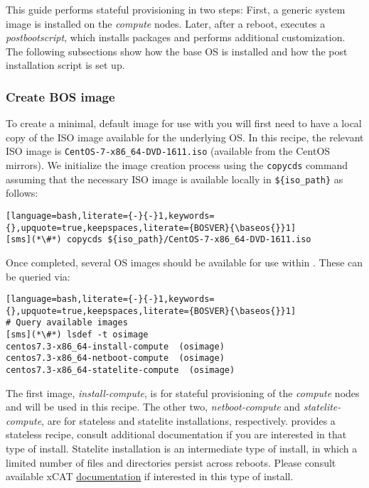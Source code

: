 
This guide performs stateful provisioning in two steps: First, a generic system
image is installed on the {\em compute} nodes. Later, after a reboot, \xCAT{}
executes a  {\em postbootscript}, which installs   \OHPC{} packages and performs
additional customization. The following subsections show how the base OS is
installed and how the post installation script is set up.

\subsubsection{Create BOS image} \label{sec:assemble_bos}

To create a minimal, default image for use with \xCAT{} you will first need to
have a local copy of the ISO image available for the underlying OS. In this
recipe, the relevant ISO image is \texttt{CentOS-7-x86\_64-DVD-1611.iso}
(available from the CentOS mirrors). We initialize the image creation process
using the \texttt{copycds} command assuming that the necessary ISO image is
available locally in \texttt{\$\{iso\_path\}} as follows:

\begin{lstlisting}[language=bash,literate={-}{-}1,keywords={},upquote=true,keepspaces,literate={BOSVER}{\baseos{}}1]
[sms](*\#*) copycds ${iso_path}/CentOS-7-x86_64-DVD-1611.iso
\end{lstlisting}

\noindent Once completed, several OS images should be available for use within \xCAT{}. These can be queried via:

\begin{lstlisting}[language=bash,literate={-}{-}1,keywords={},upquote=true,keepspaces,literate={BOSVER}{\baseos{}}1]
# Query available images
[sms](*\#*) lsdef -t osimage
centos7.3-x86_64-install-compute  (osimage)
centos7.3-x86_64-netboot-compute  (osimage)
centos7.3-x86_64-statelite-compute  (osimage)
\end{lstlisting}


The first image, {\em install-compute}, is for stateful provisioning of the {\em
compute} nodes and will be used in this recipe.  The other two, {\em
netboot-compute} and {\em statelite-compute}, are for stateless and statelite
installations, respectively. \OHPC{} provides a stateless \xCAT{} recipe,
consult additional documentation if you are interested in that type of install.
Statelite installation is an intermediate type of install, in which a limited
number of files and directories persist across reboots.  Please consult
available xCAT \href{https://xcat-docs.readthedocs.io/en/stable/}{\color{blue}
documentation} if interested in this type of install.
